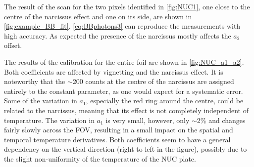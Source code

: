 The result of the scan for the two pixels identified in \autoref{fig:NUC1}, one close to the centre of the narcissus effect and one on its side, are shown in \autoref{fig:example_BB_fit}. \autoref{eq:BBphotons3} can reproduce the measurements with high accuracy. As expected the presence of the narcissus mostly affects the $a_2$ offset.

The results of the calibration for the entire foil are shown in \autoref{fig:NUC_a1_a2}. Both coefficients are affected by vignetting and the narcissus effect. It is noteworthy that the $\sim$200 counts at the centre of the narcissus are assigned entirely to the constant parameter, as one would expect for a systematic error. Some of the variation in $a_1$, especially the red ring around the centre, could be related to the narcissus, meaning that its effect is not completely independent of temperature. The variation in $a_1$ is very small, however, only $\sim$2\% and changes fairly slowly across the FOV, resulting in a small impact on the spatial and temporal temperature derivatives. Both coefficients seem to have a general dependency on the vertical direction (right to left in the figure), possibly due to the slight non-uniformity of the temperature of the NUC plate.

